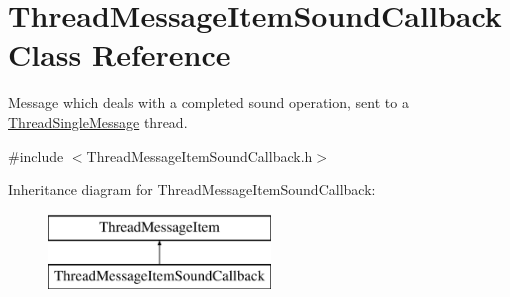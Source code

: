 \hypertarget{class_thread_message_item_sound_callback}{
\section{ThreadMessageItemSoundCallback Class Reference}
\label{class_thread_message_item_sound_callback}
}


Message which deals with a completed sound operation, sent to a \hyperlink{class_thread_single_message}{ThreadSingleMessage} thread.  




{\ttfamily \#include $<$ThreadMessageItemSoundCallback.h$>$}

Inheritance diagram for ThreadMessageItemSoundCallback:\begin{figure}[H]
\begin{center}
\leavevmode
\includegraphics[height=2.000000cm]{class_thread_message_item_sound_callback}
\end{center}
\end{figure}
